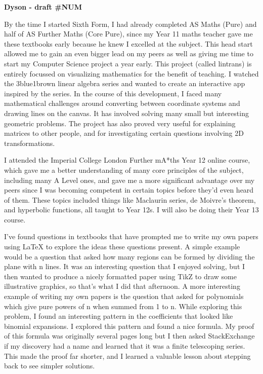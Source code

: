 \documentclass[a4paper, 12pt]{article}
\newenvironment{personalstatement}{\directlua{startPersonalStatement()}}{\directlua{stopPersonalStatement()}}
\begin{document}
\begin{center}
	\vspace*{3mm}
	\huge{\textbf{Dyson - draft \#NUM}}
\end{center}

\setlength{\parskip}{7.5ex}

\vspace*{-4ex} %

\begin{personalstatement}
By the time I started Sixth Form, I had already completed AS Maths (Pure) and half of AS Further Maths (Core Pure), since my Year 11 maths teacher gave me these textbooks early because he knew I excelled at the subject. This head start allowed me to gain an even bigger lead on my peers as well as giving me time to start my Computer Science project a year early. This project (called lintrans) is entirely focussed on visualizing mathematics for the benefit of teaching. I watched the 3blue1brown linear algebra series and wanted to create an interactive app inspired by the series. In the course of this development, I faced many mathematical challenges around converting between coordinate systems and drawing lines on the canvas. It has involved solving many small but interesting geometric problems. The project has also proved very useful for explaining matrices to other people, and for investigating certain questions involving 2D transformations.

I attended the Imperial College London Further mA*ths Year 12 online course, which gave me a better understanding of many core principles of the subject, including many A Level ones, and gave me a more significant advantage over my peers since I was becoming competent in certain topics before they'd even heard of them. These topics included things like Maclaurin series, de Moivre's theorem, and hyperbolic functions, all taught to Year 12s. I will also be doing their Year 13 course.

I've found questions in textbooks that have prompted me to write my own papers using LaTeX to explore the ideas these questions present. A simple example would be a question that asked how many regions can be formed by dividing the plane with n lines. It was an interesting question that I enjoyed solving, but I then wanted to produce a nicely formatted paper using TikZ to draw some illustrative graphics, so that's what I did that afternoon. A more interesting example of writing my own papers is the question that asked for polynomials which give pure powers of n when summed from 1 to n. While exploring this problem, I found an interesting pattern in the coefficients that looked like binomial expansions. I explored this pattern and found a nice formula. My proof of this formula was originally several pages long but I then asked StackExchange if my discovery had a name and learned that it was a finite telescoping series. This made the proof far shorter, and I learned a valuable lesson about stepping back to see simpler solutions.


\end{personalstatement}
\end{document}
